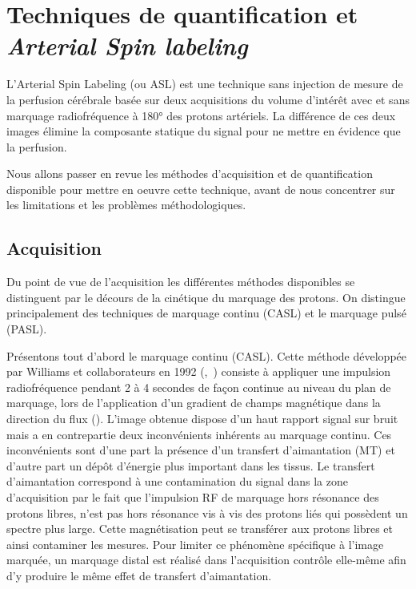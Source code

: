 
\chapter{Techniques de quantification et {\em Arterial Spin labeling}}
\label{chap:asl}
	\minitoc


L’Arterial Spin Labeling (ou ASL) est une technique sans injection de mesure de la perfusion cérébrale basée sur deux acquisitions du volume d’intérêt avec et sans marquage radiofréquence à 180° des protons artériels. La différence de ces deux images élimine la composante statique du signal pour ne mettre en évidence que la perfusion.

Nous allons passer en revue les méthodes d’acquisition et de quantification disponible pour mettre en oeuvre cette technique, avant de nous concentrer sur les limitations et les problèmes méthodologiques.
\section{Acquisition}
Du point de vue de l’acquisition les différentes méthodes disponibles se distinguent par le décours de la cinétique du marquage des protons. On distingue principalement des techniques de marquage continu (CASL) et le marquage pulsé (PASL).

Présentons tout d’abord le marquage continu (CASL). Cette méthode développée par Williams et collaborateurs en 1992  (\cite{Detre1992},~\cite{Williams1992}) consiste à appliquer une impulsion radiofréquence pendant 2 à 4 secondes de façon continue au niveau du plan de marquage, lors de l’application d’un gradient de champs magnétique dans la direction du flux (\cite{Ferre2011}). L’image obtenue dispose d’un haut rapport signal sur bruit mais a en contrepartie deux inconvénients inhérents au marquage continu. Ces inconvénients sont d’une part la présence d’un transfert d’aimantation (MT) et d’autre part un dépôt d’énergie plus important dans les tissus. Le transfert d’aimantation correspond à une contamination du signal dans la zone d'acquisition par le fait que l'impulsion RF de marquage hors résonance des protons libres, n'est pas hors résonance vis à vis des protons liés qui possèdent un spectre plus large. Cette magnétisation peut se transférer aux protons libres et ainsi contaminer les mesures. Pour limiter ce phénomène spécifique à l’image marquée, un marquage distal est réalisé dans l’acquisition contrôle elle-même afin d’y produire le même effet de transfert d’aimantation.

